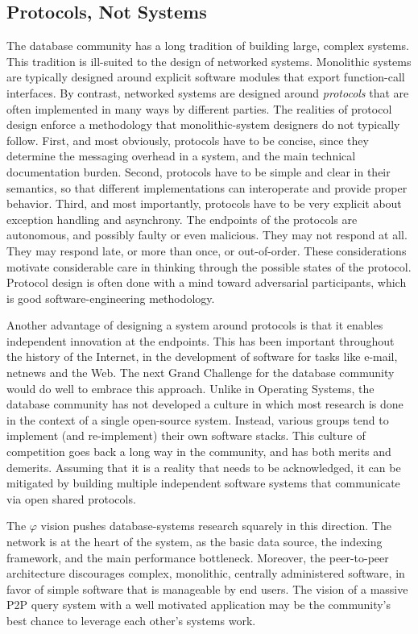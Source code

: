 \documentclass{acm_proc_article-sp}
\def\philogo{{\large $\varphi$}\xspace}
\begin{document}
\subsection{Protocols, Not Systems} The database community has a long tradition of building large, complex systems. This tradition is ill-suited to the design of networked systems. Monolithic systems are typically designed around explicit software modules that export function-call interfaces. By contrast, networked systems are designed around {\em protocols} that are often implemented in many ways by different parties. The realities of protocol design enforce a methodology that monolithic-system designers do not typically follow. First, and most obviously, protocols have to be concise, since they determine the messaging overhead in a system, and the main technical documentation burden. Second, protocols have to be simple and clear in their semantics, so that different implementations can interoperate and provide proper behavior. Third, and most importantly, protocols have to be very explicit about exception handling and asynchrony. The endpoints of the protocols are autonomous, and possibly faulty or even malicious. They may not respond at all. They may respond late, or more than once, or out-of-order. These considerations motivate considerable care in thinking through the possible states of the protocol. Protocol design is often done with a mind toward adversarial participants, which is good software-engineering methodology.

Another advantage of designing a system around protocols is that it enables independent innovation at the endpoints. This has been important throughout the history of the Internet, in the development of software for tasks like e-mail, netnews and the Web. The next Grand Challenge for the database community would do well to embrace this approach. Unlike in Operating Systems, the database community has not developed a culture in which most research is done in the context of a single open-source system. Instead, various groups tend to implement (and re-implement) their own software stacks. This culture of competition goes back a long way in the community, and has both merits and demerits. Assuming that it is a reality that needs to be acknowledged, it can be mitigated by building multiple independent software systems that communicate via open shared protocols.

The \philogo vision pushes database-systems research squarely in this
direction. The network is at the heart of the system, as the basic data
source, the indexing framework, and the main performance
bottleneck. Moreover, the peer-to-peer architecture discourages complex,
monolithic, centrally administered software, in favor of simple software
that is manageable by end users. The vision of a massive P2P query system with a well motivated application may be the community's best chance to leverage each other's systems work.
\end{document}
